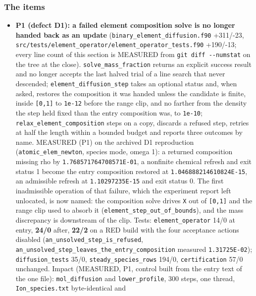 \documentclass[english,a4paper]{my_memo}
\providecommand{\tightlist}{\setlength{\itemsep}{0pt}\setlength{\parskip}{0pt}}
\begin{document}
\subsubsection{The items}\label{the-items}

\begin{itemize}
\tightlist
\item
  \textbf{P1 (defect D1): a failed element composition solve is no longer handed
  back as an update} (\texttt{binary\_element\_diffusion.f90} +311/-23,
  \texttt{src/tests/element\_operator/element\_operator\_tests.f90} +190/-13; every line
  count of this section is MEASURED from \texttt{git\ diff\ -\/-numstat} on the tree at
  the close).
  \texttt{solve\_mass\_fraction} returns an explicit success result and no longer
  accepts the last halved trial of a line search that never descended;
  \texttt{element\_diffusion\_step} takes an optional status and, when asked,
  restores the composition it was handed unless the candidate is finite,
  inside \texttt{{[}0,1{]}} to \texttt{1e-12} before the range clip, and no farther from the
  density the step held fixed than the entry composition was, to \texttt{1e-10};
  \texttt{relax\_element\_composition} steps on a copy, discards a refused step,
  retries at half the length within a bounded budget and reports three
  outcomes by name. MEASURED (P1) on the archived D1 reproduction
  (\texttt{atomic\_elem\_newton}, species mode, omega 1): a returned composition
  missing rho by \texttt{1.768571764708571E-01}, a nonfinite chemical refresh and
  exit status 1 become the entry composition restored at
  \texttt{1.046888214610824E-15}, an admissible refresh at \texttt{1.10297235E-15} and
  exit status 0. The first inadmissible operation of that failure, which the
  experiment report left unlocated, is now named: the composition solve
  drives \texttt{X} out of \texttt{{[}0,1{]}} and the range clip used to absorb it
  (\texttt{element\_step\_out\_of\_bounds}), and the mass discrepancy is downstream of
  the clip. Tests: \texttt{element\_operator} 14/0 at entry, \textbf{24/0} after, \textbf{22/2}
  on a RED build with the four acceptance actions disabled
  (\texttt{an\_unsolved\_step\_is\_refused}, \texttt{an\_unsolved\_step\_leaves\_the\_entry\_composition}
  measured \texttt{1.31725E-02}); \texttt{diffusion\_tests} 35/0, \texttt{steady\_species\_rows}
  194/0, \texttt{certification} 57/0 unchanged. Impact (MEASURED, P1, control built
  from the entry text of the one file): \texttt{mol\_diffusion} and \texttt{lower\_profile},
  300 steps, one thread, \texttt{Ion\_species.txt} byte-identical and

\end{itemize}
\end{document}
